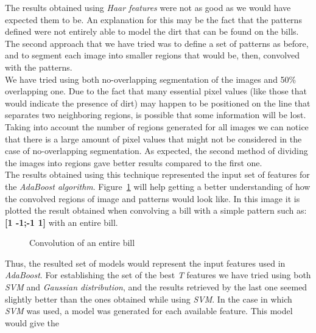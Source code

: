 \documentclass[11pt,twocolumn]{article}
\begin{document}
			\hspace*{10px}The results obtained using \emph{Haar features} were not as
			good as we would have expected them to be. An explanation for this may be the
			fact that the patterns defined were not entirely able to model the dirt that
			can be found on the bills.\\ 
			\hspace*{10px}The second approach that we have tried was to define a set of
			patterns as before, and to segment each image into smaller regions that would
			be, then, convolved with the patterns.\\ 
			\hspace*{10px}We have tried using both no-overlapping segmentation of the
			images and 50\% overlapping one. Due to the fact that many essential pixel
			values (like those that would indicate the presence of dirt) may happen to be
			positioned on the line that separates two neighboring regions, is possible
			that some information will be lost. Taking into account the number of regions
			generated for all images we can notice that there is a large amount of pixel
			values that might not be considered in the case of no-overlapping
			segmentation. As expected, the second method of dividing the images into
			regions gave better results compared to the first one.\\ 
			\hspace*{10px}The results obtained using this technique represented the input
			set of features for the \emph{AdaBoost algorithm}. Figure~\ref{convolved}
			will help getting a better understanding of how the convolved regions of
			image and patterns would look like. In this image it is plotted the result
			obtained when convolving a bill with a simple pattern such as: \textbf{[1
			-1;-1 1]} with an entire bill.\\ 
			\begin{figure}[!hbtp]
				\centering
				\caption{Convolution of an entire bill}
				\label{convolved}
			\end{figure} 
			Thus, the resulted set of models would represent the input features used in
			\emph{AdaBoost}. For establishing the set of the best \emph{T} features we
			have tried using both \emph{SVM} and \emph{Gaussian distribution}, and the
			results retrieved by the last one seemed slightly better than the ones
			obtained while using \emph{SVM}. In the case in which \emph{SVM} was used, a
			model was generated for each available feature. This model would give the
\end{document}
